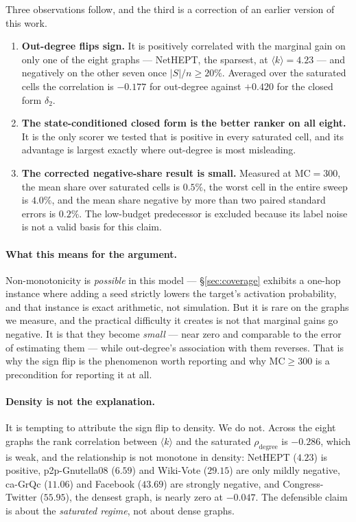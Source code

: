 

Three observations follow, and the third is a correction of an earlier version of this work.

\begin{enumerate}
  \item \textbf{Out-degree flips sign.} It is positively correlated with the marginal gain on only
        one of the eight graphs --- NetHEPT, the sparsest, at $\langle k \rangle = 4.23$ --- and
        negatively on the other seven once $|S|/n \ge 20\%$. Averaged over the saturated cells the
        correlation is $-0.177$ for out-degree against $+0.420$ for the closed form $\delta_2$.
  \item \textbf{The state-conditioned closed form is the better ranker on all eight.} It is the only
        scorer we tested that is positive in every saturated cell, and its advantage is largest
        exactly where out-degree is most misleading.
  \item \textbf{The corrected negative-share result is small.} Measured at $\mathrm{MC}=300$, the
        mean share over saturated cells is $0.5\%$, the worst cell in the entire sweep is $4.0\%$,
        and the mean share negative by more than two paired standard errors is $0.2\%$. The
        low-budget predecessor is excluded because its label noise is not a valid basis for this
        claim.
\end{enumerate}

\paragraph{What this means for the argument.} Non-monotonicity is \emph{possible} in this model ---
\S\ref{sec:coverage} exhibits a one-hop instance where adding a seed strictly lowers the target's
activation probability, and that instance is exact arithmetic, not simulation. But it is rare on the
graphs we measure, and the practical difficulty it creates is not that marginal gains go negative.
It is that they become \emph{small} --- near zero and comparable to the error of estimating them ---
while out-degree's association with them reverses. That is why the sign flip is the phenomenon worth
reporting and why $\mathrm{MC} \ge 300$ is a precondition for reporting it at all.

\paragraph{Density is not the explanation.}
It is tempting to attribute the sign flip to density. We do not. Across the eight graphs the rank
correlation between $\langle k \rangle$ and the saturated $\rho_{\text{degree}}$ is $-0.286$, which
is weak, and the relationship is not monotone in density: NetHEPT ($4.23$) is positive,
p2p-Gnutella08 ($6.59$) and Wiki-Vote ($29.15$) are only mildly negative, ca-GrQc ($11.06$) and
Facebook ($43.69$) are strongly negative, and Congress-Twitter ($55.95$), the densest graph, is
nearly zero at $-0.047$. The defensible claim is about the \emph{saturated regime}, not about dense
graphs.

